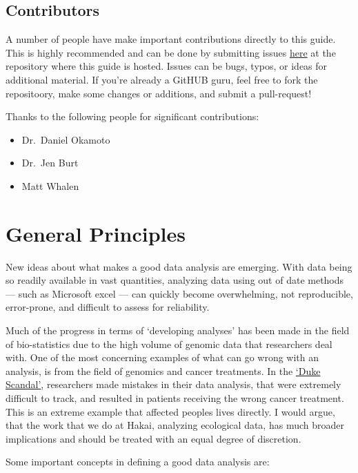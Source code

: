 \documentclass[]{book}
\providecommand{\tightlist}{%
  \setlength{\itemsep}{0pt}\setlength{\parskip}{0pt}}
\begin{document}
\section{Contributors}\label{contributors}

A number of people have make important contributions directly to this
guide. This is highly recommended and can be done by submitting issues
\href{https://github.com/HakaiInstitute/hakai_guide_to_r/issues}{here}
at the repository where this guide is hosted. Issues can be bugs, typos,
or ideas for additional material. If you're already a GitHUB guru, feel
free to fork the repositoory, make some changes or additions, and submit
a pull-request!

Thanks to the following people for significant contributions:

\begin{itemize}
\tightlist
\item
  Dr.~Daniel Okamoto
\item
  Dr.~Jen Burt
\item
  Matt Whalen
\end{itemize}

\chapter{General Principles}\label{general-principles}

New ideas about what makes a good data analysis are emerging. With data
being so readily available in vast quantities, analyzing data using out
of date methods --- such as Microsoft excel --- can quickly become
overwhelming, not reproducible, error-prone, and difficult to assess for
reliability.

Much of the progress in terms of `developing analyses' has been made in
the field of bio-statistics due to the high volume of genomic data that
researchers deal with. One of the most concerning examples of what can
go wrong with an analysis, is from the field of genomics and cancer
treatments. In the
\href{http://www.cbsnews.com/news/deception-at-duke-fraud-in-cancer-care/}{`Duke
Scandal'}, researchers made mistakes in their data analysis, that were
extremely difficult to track, and resulted in patients receiving the
wrong cancer treatment. This is an extreme example that affected peoples
lives directly. I would argue, that the work that we do at Hakai,
analyzing ecological data, has much broader implications and should be
treated with an equal degree of discretion.

Some important concepts in defining a good data analysis are:
\end{document}
